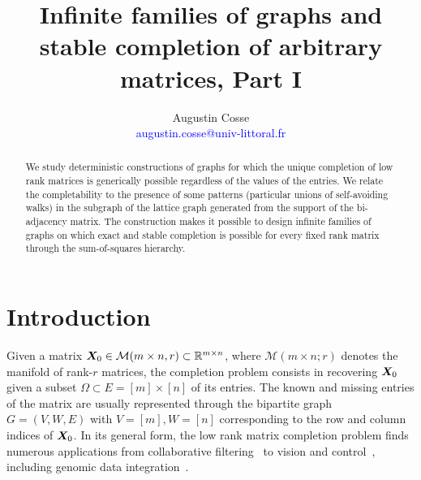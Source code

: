 \documentclass[12pt]{article}
\title{Infinite families of graphs and stable completion of arbitrary matrices, Part I}
\author{Augustin Cosse\\
\textcolor{blue}{augustin.cosse@univ-littoral.fr}}
\affil{Universit\'e du Littoral C\^ote d'Opale}
\def\bs{\ensuremath\boldsymbol}
\begin{document}
\maketitle

\begin{abstract}
We study deterministic constructions of graphs for which the unique completion of low rank matrices is generically possible regardless of the values of the entries.  We relate the completability to the presence of some patterns (particular unions of self-avoiding walks) in the subgraph of the lattice graph generated from the support of the bi-adjacency matrix.  The construction makes it possible to design infinite families of graphs on which exact and stable completion is possible for every fixed rank matrix through the sum-of-squares hierarchy. 


\end{abstract}


\section{Introduction}


Given a matrix $\bs X_0\in \mathcal{M}(m\times n, r) \subset \mathbb{R}^{m\times n}$,  where $\mathcal{M}(m\times n; r)$ denotes the manifold of rank-$r$ matrices,  the completion problem consists in recovering $\bs X_0$ given a subset $\Omega \subset E = [m]\times [n]$ of its entries.  The known and missing entries of the matrix are usually represented through the bipartite graph $G = (V, W, E)$ with $V = [m],  W = [n]$ corresponding to the row and column indices of $\bs X_0$.  In its general form, the low rank matrix completion problem finds numerous applications from collaborative filtering~\cite{goldberg1992using} to vision and control~\cite{chen2004recovering}, including genomic data integration~\cite{cai2016structured}. 
\end{document}
